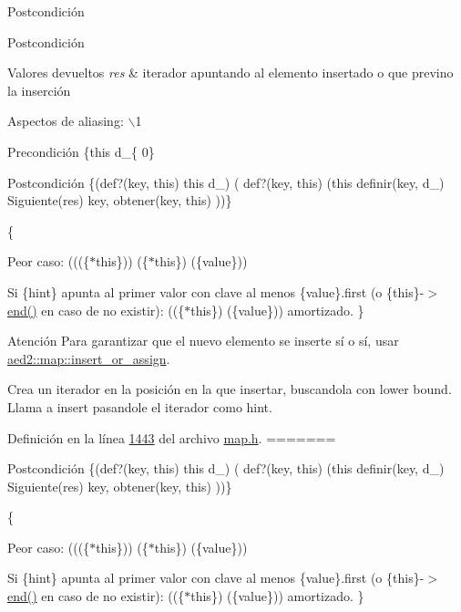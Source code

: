 \begin{DoxyPostcond}{\-Postcondición}
\begin{DoxyPostcond}{\-Postcondición}
\begin{DoxyRetVals}{\-Valores devueltos}
{\em res} & iterador apuntando al elemento insertado o que previno la inserción\\
\hline
\end{DoxyRetVals}
\begin{DoxyParagraph}{\-Aspectos de aliasing\-:}
$\backslash$1
\end{DoxyParagraph}
\begin{DoxyPrecond}{\-Precondición}
\{this  d\-\_\-\{ 0\} 
\end{DoxyPrecond}
\begin{DoxyPostcond}{\-Postcondición}
\{(def?(key, this)  this  d\-\_)  ( def?(key, this)  (this  definir(key, d\-\_)  \-Siguiente(res)   key, obtener(key, this)  ))\}
\end{DoxyPostcond}
\{
\begin{DoxyItemize}
\item \-Peor caso\-: (((\{$\ast$this\}))  (\{$\ast$this\})  (\{value\}))
\item \-Si \{hint\} apunta al primer valor con clave al menos \{value\}.first (o \{this\}-\/$>$\hyperlink{classaed2_1_1map_a76023e6a56cb625513e1b5ea028bf983_a76023e6a56cb625513e1b5ea028bf983}{end()} en caso de no existir)\-: ((\{$\ast$this\})  (\{value\})) amortizado. \}
\end{DoxyItemize}

\begin{DoxyAttention}{\-Atención}
\-Para garantizar que el nuevo elemento se inserte sí o sí, usar \hyperlink{classaed2_1_1map_a2ef6723c183916276b0afc4a4c721475_a2ef6723c183916276b0afc4a4c721475}{aed2\-::map\-::insert\-\_\-or\-\_\-assign}.
\end{DoxyAttention}
\-Crea un iterador en la posición en la que insertar, buscandola con lower bound. \-Llama a insert pasandole el iterador como hint. 

\-Definición en la línea \hyperlink{map_8h_source_l01443}{1443} del archivo \hyperlink{map_8h_source}{map.\-h}.
=======
\begin{DoxyPostcond}{Postcondición}
\{(def?(key, this)  this  d\+\_)  ( def?(key, this)  (this  definir(key, d\+\_)  Siguiente(res)   key, obtener(key, this)  ))\}
\end{DoxyPostcond}
\{
\begin{DoxyItemize}
\item Peor caso\+: (((\{$\ast$this\}))  (\{$\ast$this\})  (\{value\}))
\item Si \{hint\} apunta al primer valor con clave al menos \{value\}.first (o \{this\}-\/$>$\hyperlink{classaed2_1_1map_a76023e6a56cb625513e1b5ea028bf983_a76023e6a56cb625513e1b5ea028bf983}{end()} en caso de no existir)\+: ((\{$\ast$this\})  (\{value\})) amortizado. \}
\end{DoxyItemize}


\end{DoxyPostcond}
\end{DoxyPostcond}
